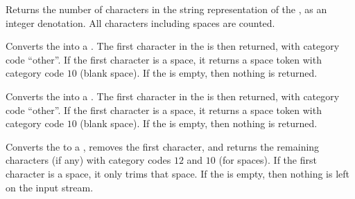 \documentclass[oneside]{book}
\begin{document}
\begin{function}{\StVarCount}
\begin{syntax}
 
\end{syntax}
Returns the number of characters in the string representation of the ,
as an integer denotation. All characters including spaces are counted.
\begin{demohigh}
\StrSet {}
\StrVarCount \lTmpaStr
\end{demohigh}
\end{function}

\begin{function}{\StrHead}
\begin{syntax}
 
\end{syntax}
Converts the  into a .
The first character in the  is then returned,
with category code \enquote{other}. If the first character is a space,
it returns a space token with category code $10$ (blank space).
If the  is empty, then nothing is returned.
\begin{demohigh}
\end{demohigh}
\end{function}

\begin{function}{\StrVarHead}
\begin{syntax}
 
\end{syntax}
Converts the  into a .
The first character in the  is then returned,
with category code \enquote{other}. If the first character is a space,
it returns a space token with category code $10$ (blank space).
If the  is empty, then nothing is returned.
\begin{demohigh}
\StrSet {}
\StrVarHead \lTmpaStr
\end{demohigh}
\end{function}

\begin{function}{\StrTail}
\begin{syntax}
 
\end{syntax}
Converts the  to a , removes the first
character, and returns the remaining characters (if any)
with category codes $12$ and $10$ (for spaces).
If the first character is a space, it only trims that space.
If the  is empty,
then nothing is left on the input stream.
\begin{demohigh}
\end{demohigh}
\end{function}
\end{document}
